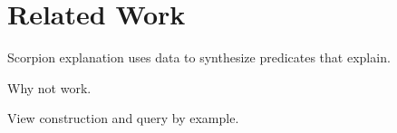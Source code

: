 \section{Related Work}
\label{s:related}


Scorpion explanation uses data to synthesize predicates that explain.

Why not work.

View construction and query by example.
